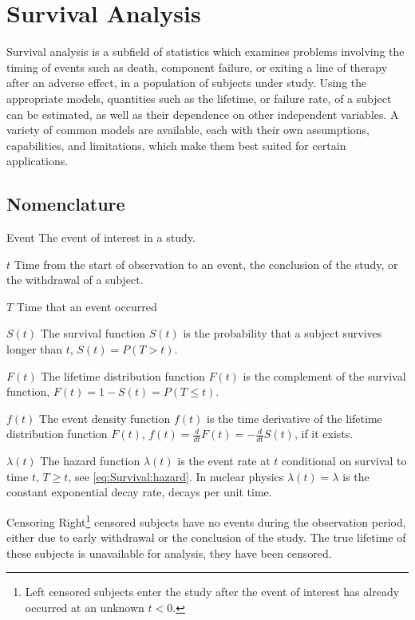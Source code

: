 \section{Survival Analysis}
\label{additional:Survival}

Survival analysis is a subfield of statistics which examines problems involving the timing of events
such as death, component failure, or exiting a line of therapy after an adverse effect, in a population of subjects under study.
Using the appropriate models, quantities such as the lifetime, or failure rate, of a subject
can be estimated, as well as their dependence on other independent variables.
A variety of common models are available,
each with their own assumptions, capabilities, and limitations,
which make them best suited for certain applications.

\subsection{Nomenclature}
\label{additional:Survival:Nomenclature}

\begin{symbollist}
	\item[Event] The event of interest in a study.
	\item[$t$] Time from the start of observation to an event, the conclusion of the study, or the withdrawal of a subject.
	\item[$T$] Time that an event occurred
	\item[$S\left(t\right)$] The survival function $S\left(t\right)$ is the probability that a subject survives longer than $t$, \ie $S\left(t\right) = P\left(T > t\right)$.
	\item[$F\left(t\right)$] The lifetime distribution function $F\left(t\right)$ is the complement of the survival function, \ie $F\left(t\right) = 1 - S\left(t\right) = P\left(T \leq t\right)$.
	\item[$f\left(t\right)$] The event density function $f\left(t\right)$ is the time derivative of the lifetime distribution function $F\left(t\right)$, $f\left(t\right) = \frac{d}{dt} F\left(t\right) = -\frac{d}{dt}S\left(t\right)$, if it exists.
	\item[$\lambda\left(t\right)$] The hazard function $\lambda\left(t\right)$ is the event rate at $t$ conditional on survival to time $t$, \ie $T \geq t$, see \ref{eq:Survival:hazard}. In nuclear physics $\lambda\left(t\right) = \lambda$ is the constant exponential decay rate, decays per unit time.
	\item[Censoring] Right\footnote{Left censored subjects enter the study after the event of interest has already occurred at an unknown $t < 0$.} censored subjects have no events during the observation period, either due to early withdrawal or the conclusion of the study. The true lifetime of these subjects is unavailable for analysis, \ie they have been censored.
\end{symbollist}

